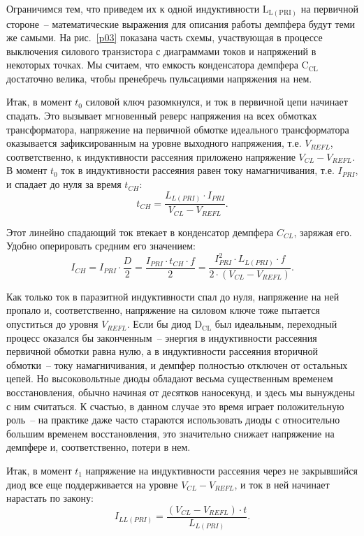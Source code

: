 Ограничимся тем, что приведем их к одной индуктивности \( \mathrm{L_{L(PRI)}} \)
на первичной стороне~-- математические выражения для описания работы демпфера
будут теми же самыми. На рис.~\ref{p03} показана часть схемы, участвующая в
процессе выключения силового транзистора с диаграммами токов и напряжений в
некоторых точках. Мы считаем, что емкость конденсатора демпфера
\( \mathrm{C_{CL}} \) достаточно велика, чтобы пренебречь пульсациями напряжения
на нем.

Итак, в момент \( t_0 \) силовой ключ разомкнулся, и ток в первичной цепи
начинает спадать. Это вызывает мгновенный реверс напряжения на всех обмотках
трансформатора, напряжение на первичной обмотке идеального трансформатора
оказывается зафиксированным на уровне выходного напряжения, т.е. \( V_{REFL} \),
соответственно, к индуктивности рассеяния приложено напряжение
\( V_{CL} - V_{REFL} \). В момент \( t_0 \) ток в индуктивности рассеяния равен
току намагничивания, т.е. \( I_{PRI} \), и спадает до нуля за время \( t_{CH} \):
\begin{equation}
	t_{CH} = \frac{L_{L(PRI)}\cdot I_{PRI}}{V_{CL} - V_{REFL}}.
\end{equation}

Этот линейно спадающий ток втекает в конденсатор демпфера \( C_{CL} \), заряжая
его. Удобно оперировать средним его значением:
\begin{equation}
	I_{CH} = I_{PRI}\cdot\frac{D}{2} = \frac{I_{PRI}\cdot t_{CH}\cdot f}{2} =
	\frac{I_{PRI}^2\cdot L_{L(PRI)}\cdot f}{2\cdot (V_{CL} - V_{REFL})}.
\end{equation}

Как только ток в паразитной индуктивности спал до нуля, напряжение на ней пропало и, 
соответственно, напряжение на силовом ключе тоже пытается опуститься до уровня
\( V_{REFL} \). Если бы диод \( \mathrm{D_{CL}} \) был идеальным, переходный
процесс оказался бы законченным~-- энергия в индуктивности рассеяния первичной
обмотки равна нулю, а в индуктивности рассеяния вторичной обмотки~-- току
намагничивания, и демпфер полностью отключен от остальных цепей. Но
высоковольтные диоды обладают весьма существенным временем восстановления,
обычно начиная от десятков наносекунд, и здесь мы вынуждены с ним считаться. К
счастью, в данном случае это время играет положительную роль~-- на практике даже
часто стараются использовать диоды с относительно большим временем
восстановления, это значительно снижает напряжение на демпфере и,
соответственно, потери в нем.

Итак, в момент \( t_1 \) напряжение на индуктивности рассеяния через не
закрывшийся диод все еще поддерживается на уровне \( V_{CL} - V_{REFL} \), и
ток в ней начинает нарастать по закону:
\begin{equation}
	I_{LL(PRI)} = \frac{(V_{CL} - V_{REFL})\cdot t}{L_{L(PRI)}}.
\end{equation}

